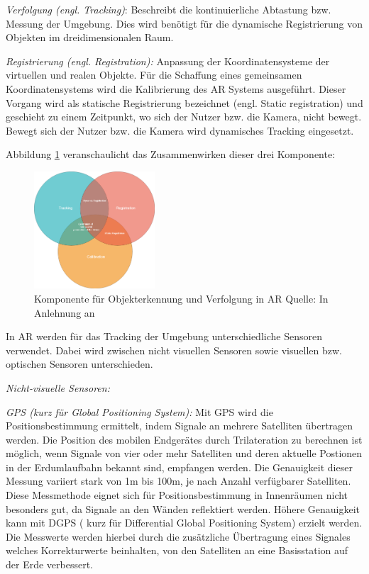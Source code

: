 \textit{Verfolgung (engl. Tracking)}: Beschreibt die kontinuierliche Abtastung bzw. Messung der Umgebung. Dies wird benötigt für die dynamische Registrierung von Objekten im dreidimensionalen Raum. 

\textit{Registrierung (engl. Registration):} Anpassung der Koordinatensysteme der virtuellen und realen Objekte. Für die Schaffung eines gemeinsamen Koordinatensystems wird die Kalibrierung des AR Systems 
ausgeführt. Dieser Vorgang wird als statische Registrierung bezeichnet (engl. Static registration) und geschieht zu einem Zeitpunkt, wo sich der Nutzer bzw. die Kamera, nicht bewegt. Bewegt sich der 
Nutzer bzw. die Kamera wird dynamisches Tracking eingesetzt. 

Abbildung \ref{img:komponentsoftracking} veranschaulicht das Zusammenwirken dieser drei Komponente:

\begin{figure}[H]
	\centering
	\includegraphics[width=0.4\textwidth]{resources/fundamentals/Tracking.png}
	\caption{Komponente für Objekterkennung und Verfolgung in AR Quelle: In Anlehnung an \cite[S.~86]{DieterSchmalstieg2016}}
	\label{img:komponentsoftracking}
\end{figure}

In AR werden für das Tracking der Umgebung unterschiedliche Sensoren verwendet. Dabei wird zwischen nicht visuellen Sensoren sowie visuellen bzw. optischen Sensoren  unterschieden. 

\textit{Nicht-visuelle Sensoren:}  

\textit{GPS (kurz für Global Positioning System):} Mit GPS wird die Positionsbestimmung ermittelt, indem Signale an mehrere Satelliten übertragen werden. Die Position des mobilen Endgerätes durch Trilateration zu berechnen ist 
möglich, wenn Signale von vier oder mehr Satelliten und deren aktuelle Postionen in der Erdumlaufbahn bekannt sind, empfangen werden. Die Genauigkeit dieser Messung variiert stark von 1m bis 100m, je nach Anzahl verfügbarer Satelliten. 
\cite[S.~2]{Arora2017}\cite[S.~100]{DieterSchmalstieg2016} Diese Messmethode eignet sich für Positionsbestimmung in Innenräumen nicht besonders gut, da Signale an den Wänden reflektiert werden. 
Höhere Genauigkeit kann mit  DGPS ( kurz für Differential Global Positioning System) erzielt werden. Die Messwerte werden hierbei durch die zusätzliche Übertragung eines Signales welches Korrekturwerte beinhalten, von den Satelliten an eine Basisstation auf der Erde verbessert. \\

